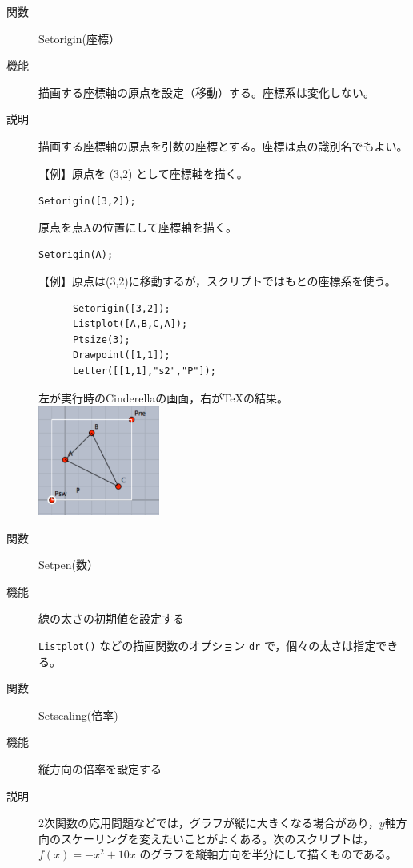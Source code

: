 \documentclass[papersize,a4paper,12pt,uplatex]{jsarticle}
\begin{document}
\begin{description}
\vspace{\baselineskip}
\hypertarget{setorigin}{}
\item[関数]  Setorigin(座標）      
\item[機能]  描画する座標軸の原点を設定（移動）する。座標系は変化しない。
\item[説明]  描画する座標軸の原点を引数の座標とする。座標は点の識別名でもよい。

\vspace{\baselineskip}
【例】原点を (3,2) として座標軸を描く。

\hspace{10mm}  \verb|Setorigin([3,2]);|

原点を点Aの位置にして座標軸を描く。

\hspace{10mm}  \verb|Setorigin(A);|  

\vspace{\baselineskip}
  【例】原点は(3,2)に移動するが，スクリプトではもとの座標系を使う。
\begin{verbatim}
      Setorigin([3,2]);
      Listplot([A,B,C,A]);
      Ptsize(3);
      Drawpoint([1,1]);
      Letter([[1,1],"s2","P"]);
\end{verbatim}
  左が実行時のCinderellaの画面，右が\TeX の結果。\\

\hspace{10mm} \includegraphics[bb=0 0 227 205 , width=4cm]{Fig/setorigin.pdf}      

\vspace{\baselineskip}
\hypertarget{setpen}{}
\item[関数]  Setpen(数）      
\item[機能]  線の太さの初期値を設定する

\verb|Listplot()| などの描画関数のオプション \verb|dr| で，個々の太さは指定できる。

\vspace{\baselineskip}
\hypertarget{setscaling}{}
\item[関数]  Setscaling(倍率)
\item[機能]  縦方向の倍率を設定する
\item[説明]  2次関数の応用問題などでは，グラフが縦に大きくなる場合があり，$y$軸方向のスケーリングを変えたいことがよくある。次のスクリプトは，$f(x)=-x^2+10x$ のグラフを縦軸方向を半分にして描くものである。


\end{description}
\end{document}
